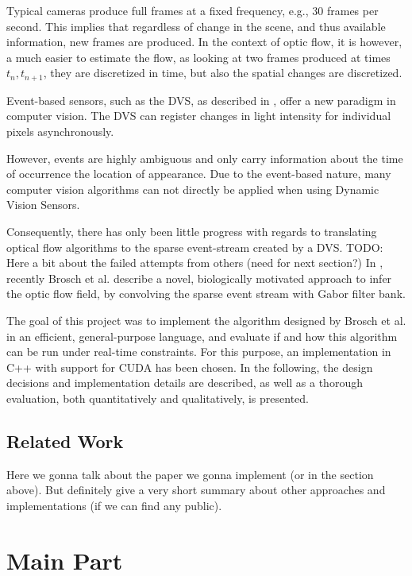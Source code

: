 \documentclass[a4paper,twoside, openright,12pt]{report}
\begin{document}
Typical cameras produce full frames at a fixed frequency, e.g., 30 frames per second.
This implies that regardless of change in the scene, and thus available information, new frames are produced.
In the context of optic flow, it is however, a much easier to estimate the flow, as looking at two frames produced at times $t_n,t_{n+1}$, they are discretized in time, but also the spatial changes are discretized.

Event-based sensors, such as the DVS, as described in \cite{Delbruck}, offer a new paradigm in computer vision. 
The DVS can register changes in light intensity for individual pixels asynchronously.

However, events are highly ambiguous and only carry information about the time of occurrence the location of appearance.
Due to the event-based nature, many computer vision algorithms can not directly be applied when using Dynamic Vision Sensors.

Consequently, there has only been little progress with regards to translating optical flow algorithms to the sparse event-stream created by a DVS.
TODO: Here a bit about the failed attempts from others (need for next section?)
In \cite{Brosch2015}, recently Brosch et al. describe a novel, biologically motivated approach to infer the optic flow field, by convolving the sparse event stream with Gabor filter bank.

The goal of this project was to implement the algorithm designed by Brosch et al. in an efficient, general-purpose language, and evaluate if and how this algorithm can be run under real-time constraints.
For this purpose, an implementation in C++ with support for CUDA has been chosen.
In the following, the design decisions and implementation details are described, as well as a thorough evaluation, both quantitatively and qualitatively, is presented.

\section{Related Work}

Here we gonna talk about the paper we gonna implement (or in the section above).
But definitely give a very short summary about other approaches and implementations (if we can find any public).




\chapter{Main Part}
\end{document}
